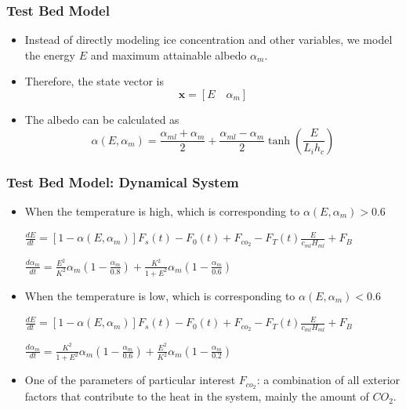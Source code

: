 \documentclass{beamer}
\newcommand{\mx}{\textbf{x}}
\begin{document}
\begin{frame}
\frametitle{Test Bed Model}
\begin{itemize}
	\item Instead of directly modeling ice concentration and other variables, we model the energy $E$ and maximum attainable albedo $\alpha_m$.
	\item Therefore, the state vector is 
\[\mx =[E\quad \alpha_m]\]
	\item The albedo can be calculated as 
\[\alpha(E,\alpha_m)=\frac{\alpha_{ml}+\alpha_m}{2}+\frac{\alpha_{ml}-\alpha_m}{2}\tanh\left(\frac{E}{L_i h_{c}} \right)\]
\end{itemize}
\end{frame}
\begin{frame}
\frametitle{Test Bed Model: Dynamical System}
{\setlength{\parskip}{0.5em}
\begin{itemize}
\item When the temperature is high, which is corresponding to $\alpha(E,\alpha_m)>0.6$ \par
$\frac{dE}{dt}=[1-\alpha(E,\alpha_{m})]F_s(t)-F_0(t)+F_{co_2}-F_T(t)\frac{E}{c_{ml} H_{ml}}+F_B $ \par
$\frac{d \alpha_{m}}{dt}= \frac{E^2}{K^2}\alpha_{m}\left(1-\frac{\alpha_{m}}{0.8}\right) + \frac{K^2}{1+E^2}\alpha_{m}\left(1-\frac{\alpha_{m}}{0.6}\right) $ \par
\item When the temperature is low, which is corresponding to $\alpha(E,\alpha_m)<0.6$ \par
$\frac{dE}{dt}=[1-\alpha(E,\alpha_{m})]F_s(t)-F_0(t)+F_{co_2}-F_T(t)\frac{E}{c_{ml} H_{ml}}+F_B $\par
$\frac{ d \alpha_{m}}{dt}=\frac{K^2}{1+E^2}\alpha_{m}\left(1-\frac{\alpha_{m}}{0.6}\right) +\frac{E^2}{K^2}\alpha_{m}\left(1-\frac{\alpha_{m}}{0.2}\right)$ \par
\item One of the parameters of particular interest $F_{co_2}$: a combination of all exterior factors that contribute to the heat in the system, mainly the amount of $CO_2$.
\end{itemize}
}
\end{frame}
\end{document}
